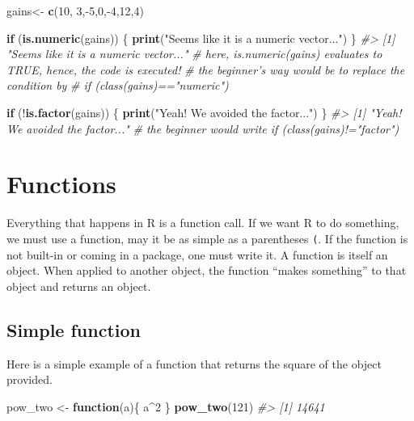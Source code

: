 \documentclass[]{book}
\newenvironment{Shaded}{}{}
\newcommand{\CommentTok}[1]{\textcolor[rgb]{0.38,0.63,0.69}{\textit{#1}}}
\newcommand{\ControlFlowTok}[1]{\textcolor[rgb]{0.00,0.44,0.13}{\textbf{#1}}}
\newcommand{\DecValTok}[1]{\textcolor[rgb]{0.25,0.63,0.44}{#1}}
\newcommand{\KeywordTok}[1]{\textcolor[rgb]{0.00,0.44,0.13}{\textbf{#1}}}
\newcommand{\NormalTok}[1]{#1}
\newcommand{\OperatorTok}[1]{\textcolor[rgb]{0.40,0.40,0.40}{#1}}
\newcommand{\StringTok}[1]{\textcolor[rgb]{0.25,0.44,0.63}{#1}}
\theoremstyle{definition}
\theoremstyle{definition}
\theoremstyle{definition}
\theoremstyle{remark}
\begin{document}
\begin{Shaded}
\begin{Highlighting}[]
\NormalTok{gains<-}\StringTok{ }\KeywordTok{c}\NormalTok{(}\DecValTok{10}\NormalTok{, }\DecValTok{3}\NormalTok{,}\OperatorTok{-}\DecValTok{5}\NormalTok{,}\DecValTok{0}\NormalTok{,}\OperatorTok{-}\DecValTok{4}\NormalTok{,}\DecValTok{12}\NormalTok{,}\DecValTok{4}\NormalTok{)}

\ControlFlowTok{if}\NormalTok{ (}\KeywordTok{is.numeric}\NormalTok{(gains)) \{}
  \KeywordTok{print}\NormalTok{(}\StringTok{"Seems like it is a numeric vector..."}\NormalTok{)}
\NormalTok{\}}
\CommentTok{#> [1] "Seems like it is a numeric vector..."}
\CommentTok{# here, is.numeric(gains) evaluates to TRUE, hence, the code is executed!}
\CommentTok{# the beginner's way would be to replace the condition by}
\CommentTok{# if (class(gains)=="numeric")}

\ControlFlowTok{if}\NormalTok{ (}\OperatorTok{!}\KeywordTok{is.factor}\NormalTok{(gains)) \{}
  \KeywordTok{print}\NormalTok{(}\StringTok{"Yeah! We avoided the factor..."}\NormalTok{)}
\NormalTok{\}}
\CommentTok{#> [1] "Yeah! We avoided the factor..."}
\CommentTok{# the beginner would write if (class(gains)!="factor")}
\end{Highlighting}
\end{Shaded}

\hypertarget{functions}{%
\chapter{Functions}\label{functions}}

Everything that happens in R is a function call. If we want R to do
something, we must use a function, may it be as simple as a parentheses
\texttt{(}. If the function is not built-in or coming in a package, one
must write it. A function is itself an object. When applied to another
object, the function ``makes something'' to that object and returns an
object.

\hypertarget{simple-function}{%
\section{Simple function}\label{simple-function}}

Here is a simple example of a function that returns the square of the
object provided.

\begin{Shaded}
\begin{Highlighting}[]
\NormalTok{pow_two <-}\StringTok{ }\ControlFlowTok{function}\NormalTok{(a)\{}
\NormalTok{  a}\OperatorTok{^}\DecValTok{2}
\NormalTok{\}}
\KeywordTok{pow_two}\NormalTok{(}\DecValTok{121}\NormalTok{)}
\CommentTok{#> [1] 14641}
\end{Highlighting}
\end{Shaded}
\end{document}

